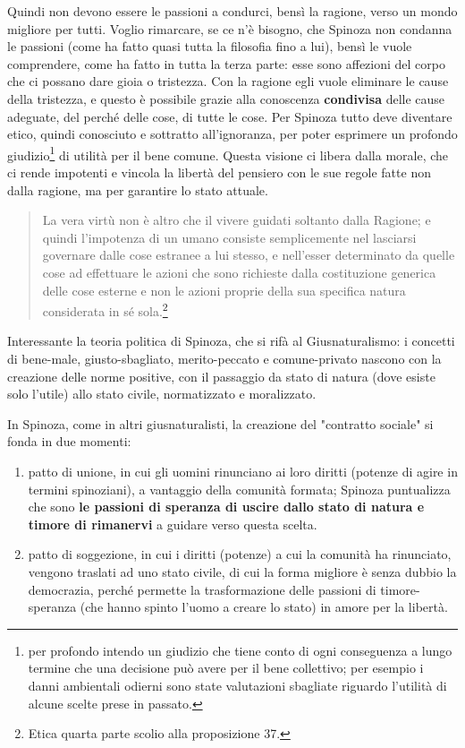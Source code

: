 Quindi non devono essere le passioni a condurci, bensì la ragione, verso un mondo migliore per tutti. Voglio rimarcare, se ce n'è bisogno, che Spinoza non condanna le passioni (come ha fatto quasi tutta la filosofia fino a lui), bensì le vuole comprendere, come ha fatto in tutta la terza parte: esse sono affezioni del corpo che ci possano dare gioia o tristezza. Con la ragione egli vuole eliminare le cause della tristezza, e questo è possibile grazie alla conoscenza \textbf{condivisa} delle cause adeguate, del perché delle cose, di tutte le cose. Per Spinoza tutto deve diventare etico, quindi conosciuto e sottratto all'ignoranza, per poter esprimere un profondo giudizio\footnote{per profondo intendo un giudizio che tiene conto di ogni conseguenza a lungo termine che una decisione può avere per il bene collettivo; per esempio i danni ambientali odierni sono state valutazioni sbagliate riguardo l'utilità di alcune scelte prese in passato.} di utilità per il bene comune. Questa visione ci libera dalla morale, che  ci rende impotenti e vincola la libertà del pensiero con le sue regole fatte non dalla ragione, ma per garantire lo stato attuale.

\begin{quotation}
	\small La vera virtù non è altro che il vivere guidati soltanto dalla Ragione; e quindi l’impotenza di
	un umano consiste semplicemente nel lasciarsi governare dalle cose estranee a lui stesso, e
	nell’esser determinato da quelle cose ad effettuare le azioni che sono richieste dalla costituzione generica delle cose esterne e non le azioni proprie della sua specifica natura considerata in sé sola.\footnote{Etica quarta parte scolio alla proposizione 37.}
\end{quotation}

Interessante la teoria politica di Spinoza, che si rifà al Giusnaturalismo: i concetti di bene-male, giusto-sbagliato, merito-peccato e comune-privato nascono con la creazione delle norme positive, con il passaggio da stato di natura (dove esiste solo l'utile) allo stato civile, normatizzato e moralizzato.

In Spinoza, come in altri giusnaturalisti, la creazione del "contratto sociale" si fonda in due momenti:
\begin{enumerate}
	\item patto di unione, in cui gli uomini rinunciano ai loro diritti (potenze di agire in termini spinoziani), a vantaggio della comunità formata; Spinoza puntualizza che sono \textbf{le passioni di speranza di uscire dallo stato di natura e timore di rimanervi} a guidare verso questa scelta.
	\item patto di soggezione, in cui i diritti (potenze) a cui la comunità ha rinunciato, vengono traslati ad uno stato civile, di cui la forma migliore è senza dubbio la democrazia, perché permette la trasformazione delle passioni di timore-speranza (che hanno spinto l'uomo a creare lo stato) in amore per la libertà.
\end{enumerate}

